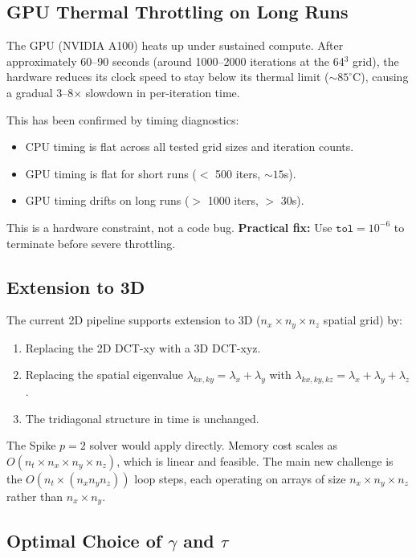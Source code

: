 \documentclass[11pt]{article}
\newcommand{\lxy}{\lambda_{kx,ky}}
\begin{document}
\subsection{GPU Thermal Throttling on Long Runs}

The GPU (NVIDIA A100) heats up under sustained compute.
After approximately 60--90 seconds (around 1000--2000 iterations at the 64$^3$ grid),
the hardware reduces its clock speed to stay below its thermal limit ($\sim 85^\circ$C),
causing a gradual 3--8$\times$ slowdown in per-iteration time.

This has been confirmed by timing diagnostics:
\begin{itemize}
  \item CPU timing is flat across all tested grid sizes and iteration counts.
  \item GPU timing is flat for short runs ($<$ 500 iters, $\sim 15$s).
  \item GPU timing drifts on long runs ($>$ 1000 iters, $>$ 30s).
\end{itemize}
This is a hardware constraint, not a code bug.
\textbf{Practical fix:} Use $\texttt{tol} = 10^{-6}$ to terminate before severe throttling.

\subsection{Extension to 3D}

The current 2D pipeline supports extension to 3D ($n_x \times n_y \times n_z$ spatial grid)
by:
\begin{enumerate}
  \item Replacing the 2D DCT-xy with a 3D DCT-xyz.
  \item Replacing the spatial eigenvalue $\lxy = \lambda_x + \lambda_y$ with
        $\lambda_{kx,ky,kz} = \lambda_x + \lambda_y + \lambda_z$.
  \item The tridiagonal structure in time is unchanged.
\end{enumerate}
The Spike $p=2$ solver would apply directly. Memory cost scales as $O(n_t \times n_x \times n_y \times n_z)$, which is
linear and feasible. The main new challenge is the $O(n_t \times (n_x n_y n_z))$ loop
steps, each operating on arrays of size $n_x \times n_y \times n_z$ rather than $n_x \times n_y$.

\subsection{Optimal Choice of $\gamma$ and $\tau$}
\end{document}
